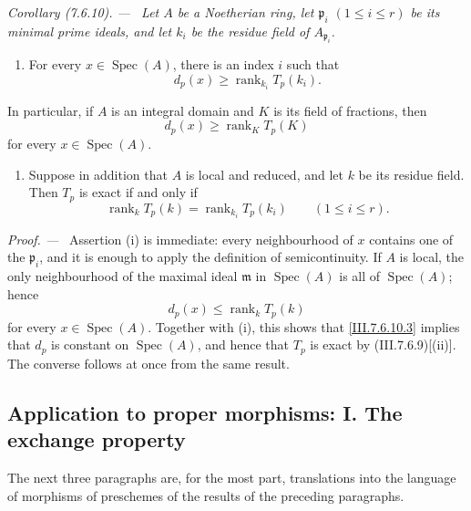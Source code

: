 \documentclass[10pt,oneside]{book}
\newcommand{\Spec}{\operatorname{Spec}}
\newcommand{\sref}[2][]{(#2)}
\newcommand{\oldpage}[2][]{\setcounter{footnote}{0}\marginpar{\scriptsize\textbf{#1}~|~#2}\ignorespaces}
\newenvironment{corollary}[1][]{\par\medskip\noindent\itshape Corollary (#1). ---\ }{\par}
\newenvironment{proof}{\par\medskip\noindent\textit{Proof. ---\ }}{\par}
\begin{document}
\begin{corollary}[7.6.10]
\label{III.7.6.10}
Let $A$ be a Noetherian ring, let
$\mathfrak p_i$ $(1\leq i\leq r)$ be its minimal prime
ideals, and let $k_i$ be the residue field of
$A_{\mathfrak p_i}$.
\begin{enumerate}
  \item[(i)] For every $x\in\Spec(A)$, there is an index $i$
    such that
    \[
      d_p(x)\geq
      \operatorname{rank}_{k_i}T_p(k_i).
      \tag{7.6.10.1}\label{III.7.6.10.1}
    \]
\end{enumerate}
In particular, if $A$ is an integral domain and $K$ is its
field of fractions, then
\[
  d_p(x)\geq\operatorname{rank}_K T_p(K)
  \tag{7.6.10.2}\label{III.7.6.10.2}
\]
for every $x\in\Spec(A)$.

\oldpage[III]{196}
\begin{enumerate}
  \item[(ii)] Suppose in addition that $A$ is local and
    reduced, and let $k$ be its residue field.  Then $T_p$ is
    exact if and only if
    \[
      \operatorname{rank}_k T_p(k)
      =
      \operatorname{rank}_{k_i}T_p(k_i)
      \qquad(1\leq i\leq r).
      \tag{7.6.10.3}\label{III.7.6.10.3}
    \]
\end{enumerate}
\end{corollary}

\begin{proof}
Assertion \textnormal{(i)} is immediate: every neighbourhood
of $x$ contains one of the $\mathfrak p_i$, and it is enough
to apply the definition of semicontinuity.  If $A$ is local,
the only neighbourhood of the maximal ideal $\mathfrak m$ in
$\Spec(A)$ is all of $\Spec(A)$; hence
\[
  d_p(x)\leq\operatorname{rank}_k T_p(k)
\]
for every $x\in\Spec(A)$.  Together with \textnormal{(i)},
this shows that \eqref{III.7.6.10.3} implies that $d_p$ is
constant on $\Spec(A)$, and hence that $T_p$ is exact by
\sref{III.7.6.9}[(ii)].  The converse follows at once from
the same result.
\end{proof}

\egaIIISubsectionSevenSixEleven
\subsection{Application to proper morphisms: I. The exchange property}
\label{subsection:III.7.7}
\label{III.7.7}

The next three paragraphs are, for the most part,
translations into the language of morphisms of preschemes
of the results of the preceding paragraphs.
\end{document}
